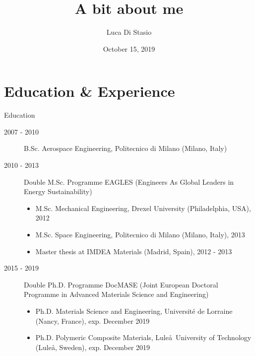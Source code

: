 \documentclass{beamer}
\title{A bit about me}
\author{Luca Di Stasio}
\date{October 15, 2019}
\begin{document}
\begin{frame}
  \titlepage
\end{frame}


\section{Education \& Experience}

\begin{frame}{Education}
\small
\begin{description}
  \item[2007 - 2010] B.Sc. Aerospace Engineering, Politecnico di Milano (Milano, Italy)
  \item[2010 - 2013] Double M.Sc. Programme EAGLES (Engineers As Global Leaders in Energy Sustainability)
  \begin{itemize}
  \item M.Sc. Mechanical Engineering, Drexel University (Philadelphia, USA), 2012
  \item M.Sc. Space Engineering, Politecnico di Milano (Milano, Italy), 2013
  \item Master thesis at IMDEA Materials (Madrid, Spain), 2012 - 2013
  \end{itemize}
  \item[2015 - 2019] Double Ph.D. Programme DocMASE (Joint European Doctoral Programme in Advanced Materials Science and Engineering)
  \begin{itemize}
  \item Ph.D. Materials Science and Engineering, Universit\'e de Lorraine (Nancy, France), exp. December 2019
  \item Ph.D. Polymeric Composite Materials, Lule\aa\ University of Technology (Lule\aa, Sweden), exp. December 2019
  \end{itemize}
\end{description}
\end{frame}
\end{document}
